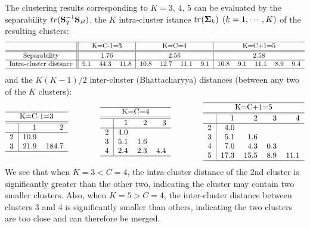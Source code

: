 \documentclass{article}
\begin{document}
The clustering results corresponding to $K=3,\,4,\,5$ can be evaluated 
by the separability $tr ({\bf S}_T^{-1}{\bf S}_B)$, the $K$ intra-cluster 
istance $tr({\bf\Sigma}_k)\,\;(k=1,\cdots,K)$ of the resulting clusters:
\begin{equation}
\begin{tabular}{c||ccc|cccc|ccccc}\hline
  &\multicolumn{3}{c}{K=C-1=3} & \multicolumn{4}{|c|}{K=C=4} & 
  \multicolumn{5}{c}{K=C+1=5} \\\hline\hline
  \mbox{Separability} & \multicolumn{3}{c}{1.76}&\multicolumn{4}{|c|}{2.56}
  & \multicolumn{5}{c}{2.58}\\\hline
  \mbox{Intra-cluster distance}
& 9.1 & 44.3 & 11.8&10.8&12.7&11.1&9.1&10.8&9.1&11.1&8.9&9.4\\\hline
\end{tabular}
\end{equation}
and the $K(K-1)/2$ inter-cluster (Bhattacharyya) distances (between any 
two of the $K$ clusters):
\begin{equation}
\begin{tabular}{r|rr}\hline
  \multicolumn{3}{c}{K=C-1=3}    \\\hline\hline
  & 1    & 2     \\\hline
2 & 10.9 &       \\
3 & 21.9 & 184.7 \\\hline
\end{tabular}
\;\;\;\;\;\;\;\;\;\;\;\;\;\;\;
\begin{tabular}{r|rrr}\hline
\multicolumn{4}{c}{K=C=4}\\\hline\hline
  & 1   & 2   & 3   \\\hline
2 & 4.0 &     &     \\
3 & 5.1 & 1.6 &     \\
4 & 2.4 & 2.3 & 4.4 \\\hline
\end{tabular}
\;\;\;\;\;\;\;\;\;\;\;\;\;\;\;
\begin{tabular}{r|rrrr}\hline
  \multicolumn{5}{c}{K=C+1=5}          \\\hline\hline
  & 1   & 2    & 3   & 4    \\\hline
2 & 4.0 &      &     &      \\
3 & 5.1 &  1.6 &     &      \\
4 & 7.0 &  4.3 & 0.3 &      \\
5 &17.3 & 15.5 & 8.9 & 11.1 \\\hline
\end{tabular}
\end{equation}
We see that when $K=3<C=4$, the intra-cluster distance of the 2nd cluster is 
significantly greater than the other two, indicating the cluster may contain
two smaller clusters. Also, when $K=5>C=4$, the inter-cluster distance between 
clusters 3 and 4 is significantly smaller than others, indicating the two 
clusters are too close and can therefore be merged.
\end{document}
